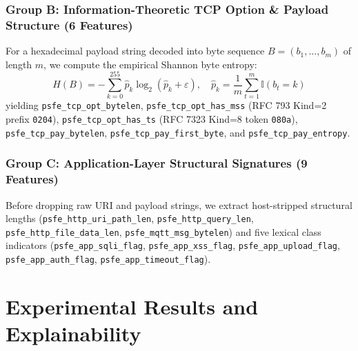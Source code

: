 \documentclass[conference]{IEEEtran}
\begin{document}
\subsubsection{Group B: Information-Theoretic TCP Option \& Payload Structure (6 Features)}
For a hexadecimal payload string decoded into byte sequence $B = (b_1, \dots, b_m)$ of length $m$, we compute the empirical Shannon byte entropy:
\begin{equation}
H(B) = -\sum_{k=0}^{255} \hat{p}_k \log_2(\hat{p}_k + \varepsilon), \quad \hat{p}_k = \frac{1}{m}\sum_{t=1}^{m} \mathbb{I}(b_t = k)
\end{equation}
yielding \texttt{psfe\_tcp\_opt\_bytelen}, \texttt{psfe\_tcp\_opt\_has\_mss} (RFC 793 Kind=2 prefix \texttt{0204}), \texttt{psfe\_tcp\_opt\_has\_ts} (RFC 7323 Kind=8 token \texttt{080a}), \texttt{psfe\_tcp\_pay\_bytelen}, \texttt{psfe\_tcp\_pay\_first\_byte}, and \texttt{psfe\_tcp\_pay\_entropy}.

\subsubsection{Group C: Application-Layer Structural Signatures (9 Features)}
Before dropping raw URI and payload strings, we extract host-stripped structural lengths (\texttt{psfe\_http\_uri\_path\_len}, \texttt{psfe\_http\_query\_len}, \texttt{psfe\_http\_file\_data\_len}, \texttt{psfe\_mqtt\_msg\_bytelen}) and five lexical class indicators (\texttt{psfe\_app\_sqli\_flag}, \texttt{psfe\_app\_xss\_flag}, \texttt{psfe\_app\_upload\_flag}, \texttt{psfe\_app\_auth\_flag}, \texttt{psfe\_app\_timeout\_flag}).

\section{Experimental Results and Explainability}
\end{document}
